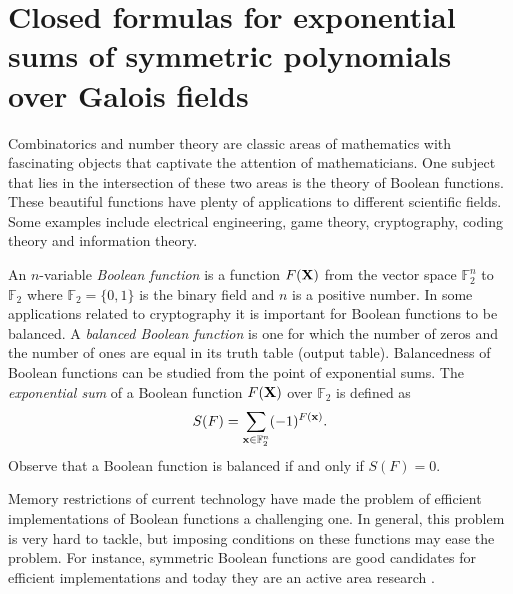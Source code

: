  
\chapter
{Closed formulas for exponential sums of symmetric polynomials over Galois fields}
\label{Closed formulas for exponential sums of symmetric polynomials over Galois fields} %



Combinatorics and number theory are classic areas of mathematics with fascinating objects that captivate the attention of mathematicians.  One subject that lies in the intersection of these two areas is the theory of Boolean functions.  These beautiful functions have plenty of applications to different scientific fields.  Some examples include electrical engineering, game theory, cryptography, coding theory and information theory.  

An $n$-variable {\em Boolean function} is a function $F({\bf X})$ from the vector space $\mathbb{F}_2^n$ to $\mathbb{F}_2$ where $\mathbb{F}_2=\{0,1\}$ is the binary field and $n$ is a positive number.  In some applications related to cryptography it is important for Boolean functions to be balanced.  A {\it balanced Boolean function} is one for which the number of zeros and the number of ones are equal in its truth table (output table). Balancedness of Boolean functions can be studied from the point of exponential sums.  The {\em exponential sum} of a Boolean function $F({\bf X})$ over $\mathbb{F}_2$ is defined as
\begin{equation}
\label{expS}
S(F)=\sum_{{\bf x}\in \mathbb{F}_2^n} (-1)^{F({\bf x})}.
\end{equation}
Observe that a Boolean function is balanced if and only if $S(F)=0$.

Memory restrictions of current technology have made the problem of efficient implementations of Boolean functions a challenging one. In general, this problem is very hard to tackle, but imposing conditions on these functions may ease the problem. For instance, symmetric Boolean functions are good candidates for efficient implementations and today they are an active area research  \cite{cai, cm1, cm2, cm3, ccms, cusick4, cusick2}.  

